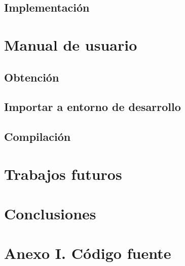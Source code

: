\documentclass{estilos-y-libreria}
\begin{document}
	\section{Implementaci\'on}
		

\chapter{Manual de usuario}
	\section{Obtenci\'on}
		
	\section{Importar a entorno de desarrollo}
		
	\section{Compilaci\'on}
		

\chapter{Trabajos futuros}

\chapter{Conclusiones}

\chapter{Anexo I. C\'odigo fuente}

\end{document}
